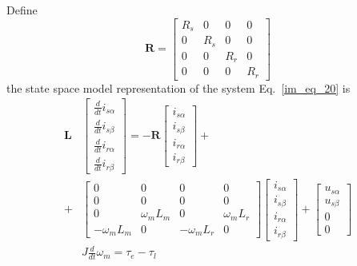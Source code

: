 \documentclass[12pt,a4paper,oneside]{book}
\begin{document}
\begin{onehalfspace}
Define 
\begin{equation}\label{im_eq_23}
	\mathbf{R}=
	\left[\begin{matrix}
		R_s & 0 & 0 & 0 \\[6pt]
		0 & R_s & 0 & 0 \\[6pt]
		0 & 0 & R_r & 0 \\[6pt]
		0 & 0 & 0 & R_r 
	\end{matrix}\right]
\end{equation}
the state space model representation of the system Eq.~\eqref{im_eq_20} is
\begin{equation}\label{im_eq_24}
	\begin{aligned}
		\mathbf{L} &
		\begin{bmatrix}
			\frac{d}{dt} i_{s\alpha} \\[6pt]
			\frac{d}{dt} i_{s\beta} \\[6pt]
			\frac{d}{dt} i_{r\alpha} \\[6pt]
			\frac{d}{dt} i_{r\beta}
		\end{bmatrix} = -\mathbf{R}
		\begin{bmatrix}
			i_{s\alpha} \\[6pt]
			i_{s\beta} \\[6pt]
			i_{r\alpha} \\[6pt]
			i_{r\beta} 
		\end{bmatrix} + \\[6pt]
		+ &
		\begin{bmatrix}
			0 & 0 & 0 & 0 \\[6pt]
			0 & 0 & 0 & 0 \\[6pt]
			0 & \omega_mL_m & 0 & \omega_mL_r \\[8pt]
			-\omega_mL_m & 0 & -\omega_mL_r & 0
		\end{bmatrix}
		\begin{bmatrix}
			i_{s\alpha} \\[6pt]
			i_{s\beta} \\[6pt]
			i_{r\alpha} \\[6pt]
			i_{r\beta} 
		\end{bmatrix} + 
		\begin{bmatrix}
			u_{s\alpha} \\[6pt]
			u_{s\beta} \\[6pt]
			0 \\[6pt]
			0
		\end{bmatrix} \\[8pt]
		&
		J\frac{d}{dt}{\omega}_m = \tau_e-\tau_l
	\end{aligned}
\end{equation}

\end{onehalfspace}
\end{document}
